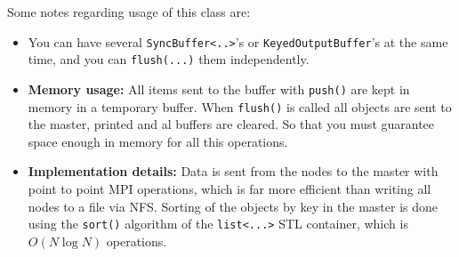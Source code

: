 Some notes regarding usage of this class are:

\begin{itemize}
\item You can have several \verb+SyncBuffer<..>+'s or
\verb+KeyedOutputBuffer+'s at the same time, and you can
\verb+flush(...)+ them independently. 

\item \textbf{Memory usage:} All items sent to the buffer with
  \verb+push()+ are kept in memory in a temporary buffer. When
  \verb+flush()+ is called all objects are sent to the master, printed
  and al buffers are cleared. So that you must guarantee space enough
  in memory for all this operations. 

\item \textbf{Implementation details:} Data is sent from the nodes to
  the master with point to point MPI operations, which is far more
  efficient than writing all nodes to a file via NFS. Sorting of the
  objects by key in the master is done using the \verb+sort()+
  algorithm of the \verb+list<...>+ STL container, which is $O(N\log
  N)$ operations. 
\end{itemize}


